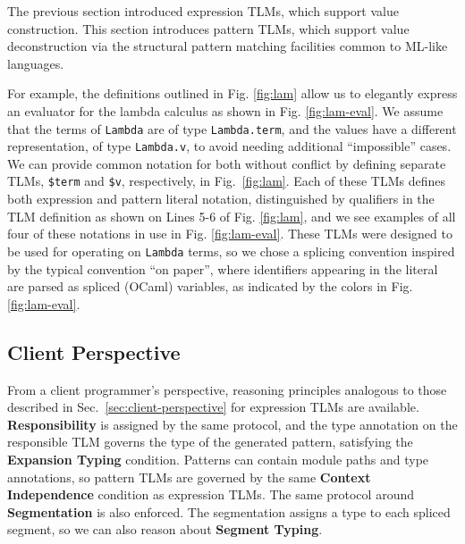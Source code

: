 \documentclass[acmsmall,screen]{acmart}
\newcommand{\li}[1]{\lstinline[basicstyle=\ttfamily\fontsize{9pt}{1em}\selectfont]{#1}}
\begin{document}
The previous section introduced expression TLMs, which support value construction. This section introduces pattern TLMs, which support value deconstruction via the structural pattern matching facilities common to ML-like languages. 

For example, the definitions outlined in Fig. \ref{fig:lam} allow us to elegantly express an evaluator for the lambda calculus as shown in Fig. \ref{fig:lam-eval}. We assume that the terms of \li{Lambda} are of type \li{Lambda.term}, and the values have a different representation, of type \li{Lambda.v}, to avoid needing additional ``impossible'' cases. We can provide common notation for both without conflict by defining separate TLMs, \li{$term} and \li{$v}, respectively, in Fig.~\ref{fig:lam}. Each of these TLMs defines both expression and pattern literal notation, distinguished by qualifiers in the TLM definition as shown on Lines 5-6 of Fig. \ref{fig:lam}, and we see examples of all four of these notations in use in Fig. \ref{fig:lam-eval}. These TLMs were designed to be used for operating on \li{Lambda} terms, so we chose a splicing convention inspired by the typical convention ``on paper'', where identifiers appearing in the literal are parsed as spliced (OCaml) variables, as indicated by the colors in Fig. \ref{fig:lam-eval}. %

\subsection{Client Perspective} From a client programmer's perspective, reasoning principles analogous to those described in Sec.~\ref{sec:client-perspective} for expression TLMs are available. \textbf{Responsibility} is assigned by the same protocol, and the type annotation on the responsible TLM governs the type of the generated pattern, satisfying the \textbf{Expansion Typing} condition. Patterns can contain module paths and type annotations, so pattern TLMs are governed by the same \textbf{Context Independence} condition as expression TLMs. The same protocol around \textbf{Segmentation} is also enforced. The segmentation assigns a type to each spliced segment, so we can also reason about \textbf{Segment Typing}.
\end{document}
